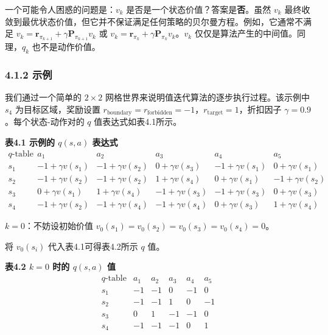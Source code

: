 \documentclass[UTF8]{article}
\begin{document}
\begin{remarkbox}
一个可能令人困惑的问题是：$v_k$ 是否是一个状态价值？答案是\textbf{否}。虽然 $v_k$ 最终收敛到最优状态价值，但它并不保证满足任何策略的贝尔曼方程。例如，它通常不满足 $v_k = \boldsymbol{r}_{\pi_{k+1}} + \gamma \boldsymbol{P}_{\pi_{k+1}} v_k$ 或 $v_k = \boldsymbol{r}_{\pi_k} + \gamma \boldsymbol{P}_{\pi_k} v_k$。$v_k$ 仅仅是算法产生的中间值。同理，$q_k$ 也不是动作价值。
\end{remarkbox}

\subsubsection*{4.1.2 示例}

我们通过一个简单的 $2 \times 2$ 网格世界来说明值迭代算法的逐步执行过程。该示例中 $s_4$ 为目标区域，奖励设置 $r_{\text{boundary}} = r_{\text{forbidden}} = -1$，$r_{\text{target}} = 1$，折扣因子 $\gamma = 0.9$。每个状态-动作对的 $q$ 值表达式如表4.1所示。

\begin{center}
\textbf{表4.1 示例的 $q(s,a)$ 表达式}
\[
\begin{array}{c|ccccc}
q\text{-table} & a_1 & a_2 & a_3 & a_4 & a_5 \\
\hline
s_1 & -1 + \gamma v(s_1) & -1 + \gamma v(s_2) & 0 + \gamma v(s_3) & -1 + \gamma v(s_1) & 0 + \gamma v(s_1) \\
s_2 & -1 + \gamma v(s_2) & -1 + \gamma v(s_2) & 1 + \gamma v(s_4) & 0 + \gamma v(s_1) & -1 + \gamma v(s_2) \\
s_3 & 0 + \gamma v(s_1) & 1 + \gamma v(s_4) & -1 + \gamma v(s_3) & -1 + \gamma v(s_3) & 0 + \gamma v(s_3) \\
s_4 & -1 + \gamma v(s_2) & -1 + \gamma v(s_4) & -1 + \gamma v(s_4) & 0 + \gamma v(s_3) & 1 + \gamma v(s_4)
\end{array}
\]
\end{center}

\textbf{$k = 0$}：不妨设初始价值 $v_0(s_1) = v_0(s_2) = v_0(s_3) = v_0(s_4) = 0$。

将 $v_0(s_i)$ 代入表4.1可得表4.2所示 $q$ 值。

\begin{center}
\textbf{表4.2 $k=0$ 时的 $q(s,a)$ 值}
\[
\begin{array}{c|ccccc}
q\text{-table} & a_1 & a_2 & a_3 & a_4 & a_5 \\
\hline
s_1 & -1 & -1 & 0 & -1 & 0 \\
s_2 & -1 & -1 & 1 & 0 & -1 \\
s_3 & 0 & 1 & -1 & -1 & 0 \\
s_4 & -1 & -1 & -1 & 0 & 1
\end{array}
\]
\end{center}
\end{document}

